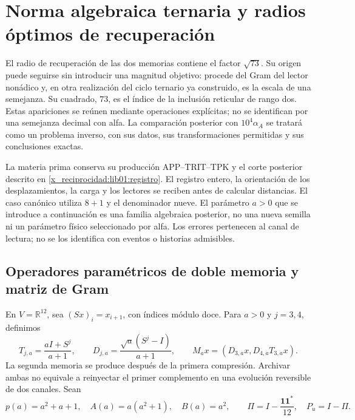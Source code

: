 \chapter{Norma algebraica ternaria y radios óptimos de recuperación}
\label{x_reciprocidad:lib02:norma-ternaria}

El radio de recuperación de las dos memorias contiene el factor
\(\sqrt{73}\). Su origen puede seguirse sin introducir una magnitud
objetivo: procede del Gram del lector nonádico y, en otra realización del
ciclo ternario ya construido, es la escala de una semejanza. Su cuadrado,
\(73\), es el índice de la inclusión reticular de rango dos. Estas
apariciones se reúnen mediante operaciones explícitas;
no se identifican por una semejanza decimal con alfa. La comparación
posterior con \(10^4\alpha_A\) se tratará como un problema inverso,
con sus datos, sus transformaciones permitidas y sus conclusiones exactas.

La materia prima conserva su producción APP--TRIT--TPK y el corte
posterior descrito en \cref{x_reciprocidad:lib01:registro}. El registro entero, la
orientación de los desplazamientos, la carga y los lectores se reciben
antes de calcular distancias. El caso canónico utiliza \(8+1\) y el
denominador nueve. El parámetro \(a>0\) que se introduce a continuación
es una familia algebraica posterior, no una nueva semilla ni un parámetro
físico seleccionado por alfa. Los errores pertenecen al canal de lectura;
no se los identifica con eventos o historias admisibles.

\section{Operadores paramétricos de doble memoria y matriz de Gram}
\label{x_reciprocidad:lib02:familia-memoria}

En \(V=\mathbb R^{12}\), sea \((Sx)_i=x_{i+1}\), con índices módulo
doce. Para \(a>0\) y \(j=3,4\), definimos
\begin{equation}
 T_{j,a}=\frac{aI+S^j}{a+1},\qquad
 D_{j,a}=\frac{\sqrt a(S^j-I)}{a+1},\qquad
 M_ax=(D_{3,a}x,D_{4,a}T_{3,a}x).
 \label{x_reciprocidad:lib02:lectores}
\end{equation}
La segunda memoria se produce después de la primera compresión. Archivar
ambas no equivale a reinyectar el primer complemento en una evolución
reversible de dos canales. Sean
\[
 p(a)=a^2+a+1,\quad A(a)=a(a^2+1),\quad B(a)=a^2,
 \qquad\Pi=I-\frac{\mathbf1\mathbf1^*}{12},\quad P_u=I-\Pi.
\]

